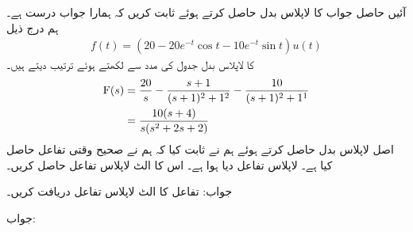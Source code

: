 آئیں حاصل جواب کا لاپلاس بدل حاصل کرتے ہوئے ثابت کریں کہ ہمارا جواب درست ہے۔ہم درج ذیل
\begin{align*}
f(t)=\left(20-20e^{-t}\cos t-10e^{-t}\sin t\right)u(t)
\end{align*}
 کا لاپلاس بدل  جدول  کی مدد سے لکھتے ہوئے ترتیب دیتے ہیں۔
\begin{align*}
{\ensuremath{{\textup{F}}}}(s)&=\frac{20}{s}-\frac{s+1}{(s+1)^2+1^2}-\frac{10}{(s+1)^2+1^1}\\
&=\frac{10(s+4)}{s(s^2+2s+2)}
\end{align*}
اصل لاپلاس بدل حاصل کرتے ہوئے ہم نے ثابت کیا کہ ہم نے صحیح وقتی تفاعل حاصل کیا ہے۔ 
لاپلاس تفاعل  دیا ہوا ہے۔ اس کا الٹ لاپلاس تفاعل  حاصل کریں۔

جواب:
تفاعل  کا الٹ لاپلاس تفاعل دریافت کریں۔

جواب:

